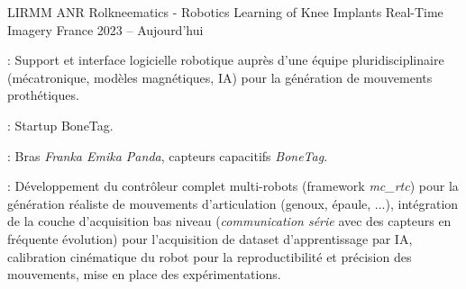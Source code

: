 \begin{cventries}
  \cventry
  {LIRMM} %
  {ANR Rolkneematics - Robotics Learning of Knee Implants Real-Time Imagery} %
  {France} %
  {2023 -- Aujourd'hui} %
  {
    \begin{cvitems}
    \item {} : Support et interface logicielle robotique auprès d'une équipe
      pluridisciplinaire (mécatronique, modèles magnétiques, IA) pour la génération de mouvements prothétiques.
    \item {} : Startup BoneTag.
    \item {} : Bras \emph{Franka Emika Panda}, capteurs
      capacitifs \emph{BoneTag}.
    \item {} : Développement du contrôleur complet multi-robots (framework
      \emph{mc\_rtc}) pour la génération réaliste de mouvements d'articulation (genoux, épaule, ...),
      intégration de la couche d'acquisition bas niveau (\emph{communication série} avec des capteurs en
      fréquente évolution) pour l'acquisition de dataset d'apprentissage par IA, calibration cinématique du
      robot pour la reproductibilité et précision des mouvements, mise en place des expérimentations.
    \end{cvitems}
  }


\end{cventries}
